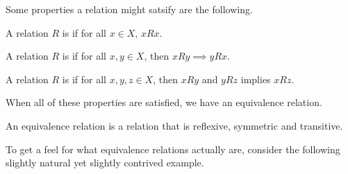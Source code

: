 \documentclass[a4paper]{scrartcl}
\begin{document}
Some properties a relation might satsify are the following.

\begin{definition}[Reflexive]
	A relation $R$ is  if for all $x \in X$, $x R x$.
\end{definition}

\begin{definition}[Symmetric]
	A relation $R$ is  if for all $x, y \in X$, then $xRy \implies y R x$.
\end{definition}

\begin{definition}[Transitive]
	A relation $R$ is  if for all $x, y, z \in X$, then $x R y$ and $y R z$ implies $x R z$.
\end{definition}

When all of these properties are satisfied, we have an equivalence relation.

\begin{definition}
	An equivalence relation is a relation that is reflexive, symmetric and transitive.
\end{definition}

To get a feel for what equivalence relations actually are, consider the following slightly natural yet slightly contrived example.
\end{document}
